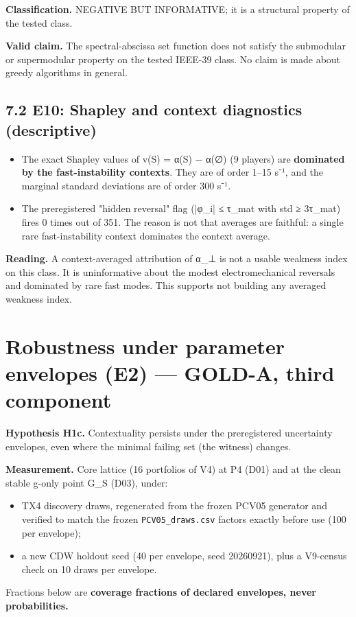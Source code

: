 \documentclass[10pt,a4paper]{article}
\begin{document}
\textbf{Classification.} NEGATIVE BUT INFORMATIVE; it is a structural property of the tested class.

\textbf{Valid claim.} The spectral-abscissa set function does not satisfy the submodular or supermodular property on the tested IEEE-39 class. No claim is made about greedy algorithms in general.

\subsection{7.2 E10: Shapley and context diagnostics (descriptive)}
\begin{itemize}
\item The exact Shapley values of v(S) = α(S) − α(∅) (9 players) are \textbf{dominated by the fast-instability contexts}. They are of order 1–15 s⁻¹, and the marginal standard deviations are of order 300 s⁻¹.
\item The preregistered "hidden reversal" flag (|φ\_i| ≤ τ\_mat with std ≥ 3τ\_mat) fires 0 times out of 351. The reason is not that averages are faithful: a single rare fast-instability context dominates the context average.
\end{itemize}
\textbf{Reading.} A context-averaged attribution of α\_⊥ is not a usable weakness index on this class. It is uninformative about the modest electromechanical reversals and dominated by rare fast modes. This supports not building any averaged weakness index.

\section{Robustness under parameter envelopes (E2) — GOLD-A, third component}
\textbf{Hypothesis H1c.} Contextuality persists under the preregistered uncertainty envelopes, even where the minimal failing set (the witness) changes.

\textbf{Measurement.} Core lattice (16 portfolios of V4) at P4 (D01) and at the clean stable g-only point G\_S (D03), under:

\begin{itemize}
\item TX4 discovery draws, regenerated from the frozen PCV05 generator and verified to match the frozen \texttt{PCV05\_\allowbreak{}draws.csv} factors exactly before use (100 per envelope);
\item a new CDW holdout seed (40 per envelope, seed 20260921), plus a V9-census check on 10 draws per envelope.
\end{itemize}
Fractions below are \textbf{coverage fractions of declared envelopes, never probabilities.}
\end{document}
